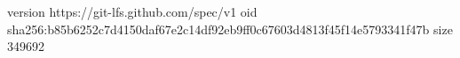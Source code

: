 version https://git-lfs.github.com/spec/v1
oid sha256:b85b6252c7d4150daf67e2c14df92eb9ff0c67603d4813f45f14e5793341f47b
size 349692
